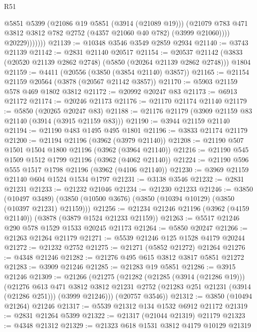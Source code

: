 \begin{lexlean}{R51}
\begin{coremodule}
                      @5851
                      @5399
                      (@21086 @19 @5851 (@3914 (@21089 @19)))
                      (@21079
                        @783
                        @471
                        @3812
                        @3812
                        @782
                        @2752
                        (@4357 @21060 @40 @782)
                        (@3999 @21060))))
                  @20229)))))))
@21139 := @10348 @3546 @3549 @2859 @2934
@21140 := @3743 @21139
@21142 := @2831 @21140 @20517
@21154 := @20537
    @21142
    (@3833 (@20520 @21139 @2862 @2748) (@5850 (@20264 @21139 @2862 @2748)))
    @1804
@21159 := @4411 (@20556 (@3850 (@3854 @21140) @3857))
@21165 := @21154 @21159 @20564 (@3878 (@20567 @21142 @3857))
@21170 := @5903 @21159 @578 @469 @1802 @3812
@21172 := @20992 @20247 @83
@21173 := @6913 @21172
@21174 := @20246 @21173
@21176 := @21170 @21174 @21140
@21179 := @5850 (@20265 @20247 @83)
@21188 := @21176 @21179 (@3909 @21159 @83 @21140 (@3914 (@3915 @21159 @83)))
@21190 := @3944 @21159 @21140
@21194 := @21190 @483 @1495 @495 @1801
@21196 := @3833 @21174 @21179
@21200 := @21194 @21196 (@3962 (@3979 @21140))
@21208 := @21190 @507 @1501 @1504 @1800 @21196 (@3962 (@3964 @21140))
@21216 := @21190 @545 @1509 @1512 @1799 @21196 (@3962 (@4062 @21140))
@21224 := @21190 @596 @555 @1517 @1798 @21196 (@3962 (@4106 @21140))
@21230 := @3969 @21159 @21140 @604 @1524 @1534 @1797
@21231 := @3138 @3546
@21232 := @2831 @21231
@21233 := @21232 @21046
@21234 := @21230 @21233
@21246 := @3850
    (@10497 @3489)
    (@3850 (@10500 @3676) (@3850 (@10394 @10129) (@3850 (@10397 @21231) @21159)))
@21256 := @21234 @21246 @21196 (@3962 (@4159 @21140)) (@3878 (@3879 @1524 @21233 @21159))
@21263 := @5517 @21246 @290 @578 @1529 @1533 @20245 @21173
@21264 := @5850 @20247
@21266 := @21263 @21264 @21179
@21271 := @5539 @21246 @125 @1528 @4179 @20244
@21272 := @21232 @2752
@21275 := @21271 (@5852 @21272) @21264
@21276 := @4348 @21246
@21282 := @21276 @495 @615 @3812 @3817 @5851 @21272
@21283 := @3909 @21246
@21285 := @21283 @19 @5851
@21286 := @3915 @21246
@21309 := @21266
    (@21275
      (@21282
        (@21285 (@3914 (@21286 @19)))
        (@21276
          @613
          @471
          @3812
          @3812
          @21231
          @2752
          (@21283 @251 @21231 (@3914 (@21286 @251)))
          (@3999 @21246)))
      (@20757 @3546))
@21312 := @3850 (@10494 @21264) @21246
@21317 := @5539 @21312 @134 @1532 @6912 @21172
@21319 := @2831 @21264 @5399
@21322 := @21317 (@21044 @21319) @21179
@21323 := @4348 @21312
@21329 := @21323 @618 @1531 @3812 @4179 @10129 @21319

\end{coremodule}
\end{lexlean}
